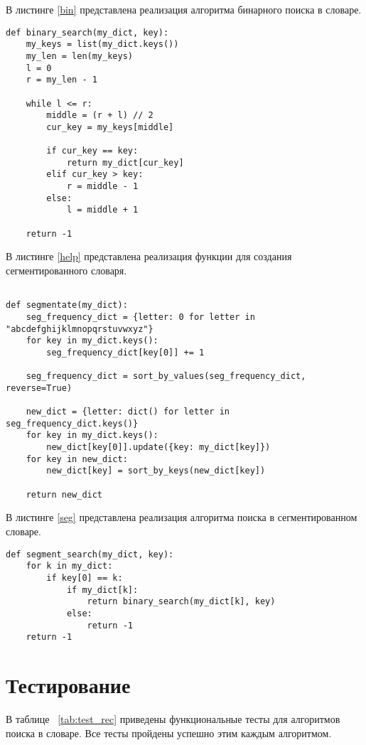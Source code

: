В листинге \ref{bin} представлена реализация алгоритма бинарного поиска в словаре.


\begin{lstlisting}[caption=Алгоритм бинарного поиска в словаре,
	label={bin}]
def binary_search(my_dict, key):
	my_keys = list(my_dict.keys())
	my_len = len(my_keys)
	l = 0
	r = my_len - 1
	
	while l <= r:
		middle = (r + l) // 2
		cur_key = my_keys[middle]
		
		if cur_key == key:
			return my_dict[cur_key]
		elif cur_key > key:
			r = middle - 1
		else:
			l = middle + 1
	
	return -1
\end{lstlisting}

\clearpage
В листинге \ref{help} представлена реализация функции для создания сегментированного словаря.


\begin{lstlisting}[caption=Функция для создания сегментированного словаря,
	label={help}]

def segmentate(my_dict):
	seg_frequency_dict = {letter: 0 for letter in "abcdefghijklmnopqrstuvwxyz"}
	for key in my_dict.keys():
		seg_frequency_dict[key[0]] += 1
	
	seg_frequency_dict = sort_by_values(seg_frequency_dict, reverse=True)
	
	new_dict = {letter: dict() for letter in seg_frequency_dict.keys()}
	for key in my_dict.keys():
		new_dict[key[0]].update({key: my_dict[key]})
	for key in new_dict:
		new_dict[key] = sort_by_keys(new_dict[key])
	
	return new_dict

\end{lstlisting}

В листинге \ref{seg} представлена реализация алгоритма поиска в сегментированном словаре.


\begin{lstlisting}[caption=Алгоритм поиска в сегментированном словаре,
	label={seg}]
def segment_search(my_dict, key):
	for k in my_dict:
		if key[0] == k:
			if my_dict[k]:
				return binary_search(my_dict[k], key)
			else:
				return -1
	return -1
\end{lstlisting}

\clearpage
\section{Тестирование}

В таблице ~\ref{tab:test_rec} приведены функциональные тесты для алгоритмов поиска в словаре. Все тесты пройдены успешно этим каждым алгоритмом.

